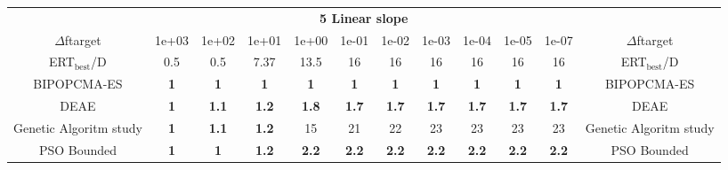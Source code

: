 \begin{tabular}{cccccccccccc}
 & \multicolumn{10}{c}{{\normalsize \textbf{5 Linear slope}}}\\
$\Delta$ftarget& 1e+03& 1e+02& 1e+01& 1e+00& 1e-01& 1e-02& 1e-03& 1e-04& 1e-05& 1e-07 & $\Delta$ftarget \\
ERT$_{\textrm{best}}$/D& 0.5& 0.5& 7.37& 13.5& 16& 16& 16& 16& 16& 16 & ERT$_{\textrm{best}}$/D \\
\hline
BIPOPCMA-ES & \textbf{1} & \textbf{1} & \textbf{1} & \textbf{1} & \textbf{1} & \textbf{1} & \textbf{1} & \textbf{1} & \textbf{1} & \textbf{1} & BIPOPCMA-ES \cite{add_an_entry_for_BIPOPCMA-ES_in_bbob.bib}\\
DEAE & \textbf{1} & \textbf{1.1} & \textbf{1.2} & \textbf{1.8} & \textbf{1.7} & \textbf{1.7} & \textbf{1.7} & \textbf{1.7} & \textbf{1.7} & \textbf{1.7} & DEAE \cite{add_an_entry_for_DEAE_in_bbob.bib}\\
Genetic Algoritm study & \textbf{1} & \textbf{1.1} & \textbf{1.2} & 15 & 21 & 22 & 23 & 23 & 23 & 23 & Genetic Algoritm study \cite{add_an_entry_for_Genetic Algoritm study_in_bbob.bib}\\
PSO Bounded & \textbf{1} & \textbf{1} & \textbf{1.2} & \textbf{2.2} & \textbf{2.2} & \textbf{2.2} & \textbf{2.2} & \textbf{2.2} & \textbf{2.2} & \textbf{2.2} & PSO Bounded \cite{add_an_entry_for_PSO Bounded_in_bbob.bib}
\end{tabular}
